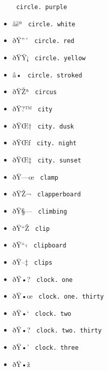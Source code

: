 \begin{itemize}
{  \texttt{\ circle.\ purple\ }}
\item
  \label{symbol-circle.white}{{ âšª }
  \texttt{\ circle.\ white\ }}
\item
  \label{symbol-circle.red}{{ ðŸ''´ }
  \texttt{\ circle.\ red\ }}
\item
  \label{symbol-circle.yellow}{{ ðŸŸ¡ }
  \texttt{\ circle.\ yellow\ }}
\item
  \label{symbol-circle.stroked}{{ â­• }
  \texttt{\ circle.\ stroked\ }}
\item
  \label{symbol-circus}{{ ðŸŽª } \texttt{\ circus\ }}
\item
  \label{symbol-city}{{ ðŸ?™ } \texttt{\ city\ }}
\item
  \label{symbol-city.dusk}{{ ðŸŒ† }
  \texttt{\ city.\ dusk\ }}
\item
  \label{symbol-city.night}{{ ðŸŒƒ }
  \texttt{\ city.\ night\ }}
\item
  \label{symbol-city.sunset}{{ ðŸŒ‡ }
  \texttt{\ city.\ sunset\ }}
\item
  \label{symbol-clamp}{{ ðŸ---œ } \texttt{\ clamp\ }}
\item
  \label{symbol-clapperboard}{{ ðŸŽ¬ }
  \texttt{\ clapperboard\ }}
\item
  \label{symbol-climbing}{{ ðŸ§--- }
  \texttt{\ climbing\ }}
\item
  \label{symbol-clip}{{ ðŸ``Ž } \texttt{\ clip\ }}
\item
  \label{symbol-clipboard}{{ ðŸ``‹ }
  \texttt{\ clipboard\ }}
\item
  \label{symbol-clips}{{ ðŸ--‡ } \texttt{\ clips\ }}
\item
  \label{symbol-clock.one}{{ ðŸ•? }
  \texttt{\ clock.\ one\ }}
\item
  \label{symbol-clock.one.thirty}{{ ðŸ•œ }
  \texttt{\ clock.\ one.\ thirty\ }}
\item
  \label{symbol-clock.two}{{ ðŸ•` }
  \texttt{\ clock.\ two\ }}
\item
  \label{symbol-clock.two.thirty}{{ ðŸ•? }
  \texttt{\ clock.\ two.\ thirty\ }}
\item
  \label{symbol-clock.three}{{ ðŸ•' }
  \texttt{\ clock.\ three\ }}
\item
  \label{symbol-clock.three.thirty}{{ ðŸ•ž }
}
\end{itemize}
